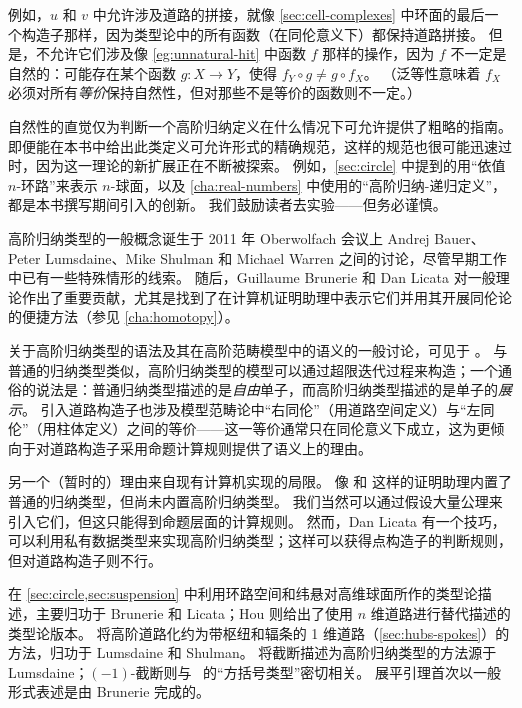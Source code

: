 例如，$u$ 和 $v$ 中允许涉及道路的拼接，就像 \cref{sec:cell-complexes} 中环面的最后一个构造子那样，因为类型论中的所有函数（在同伦意义下）都保持道路拼接。
但是，不允许它们涉及像 \cref{eg:unnatural-hit} 中函数 $f$ 那样的操作，因为 $f$ 不一定是自然的：可能存在某个函数 $g:X\to Y$，使得 $f_Y \circ g \neq g\circ f_X$。
（泛等性意味着 $f_X$ 必须对所有\emph{等价}保持自然性，但对那些不是等价的函数则不一定。）

自然性的直觉仅为判断一个高阶归纳定义在什么情况下可允许提供了粗略的指南。
即便能在本书中给出此类定义可允许形式的精确规范，这样的规范也很可能迅速过时，因为这一理论的新扩展正在不断被探索。
例如，\cref{sec:circle} 中提到的用``依值 $n$-环路''来表示 $n$-球面，以及 \cref{cha:real-numbers} 中使用的``高阶归纳-递归定义''，都是本书撰写期间引入的创新。
我们鼓励读者去实验——但务必谨慎。

\sectionNotes

高阶归纳类型的一般概念诞生于 2011 年 Oberwolfach 会议上 Andrej Bauer、Peter Lumsdaine、Mike Shulman 和 Michael Warren 之间的讨论，尽管早期工作中已有一些特殊情形的线索。
随后，Guillaume Brunerie 和 Dan Licata 对一般理论作出了重要贡献，尤其是找到了在计算机证明助理中表示它们并用其开展同伦论的便捷方法（参见 \cref{cha:homotopy}）。

关于高阶归纳类型的语法及其在高阶范畴模型中的语义的一般讨论，可见于 \cite{ls:hits}。
与普通的归纳类型类似，高阶归纳类型的模型可以通过超限迭代过程来构造；一个通俗的说法是：普通归纳类型描述的是\emph{自由}单子，而高阶归纳类型描述的是单子的\emph{展示}。
引入道路构造子也涉及模型范畴论中``右同伦''（用道路空间定义）与``左同伦''（用柱体定义）之间的等价——这一等价通常只在同伦意义下成立，这为更倾向于对道路构造子采用命题计算规则提供了语义上的理由。

另一个（暂时的）理由来自现有计算机实现的局限。
像 \Coq 和 \Agda 这样的证明助理内置了普通的归纳类型，但尚未内置高阶归纳类型。
我们当然可以通过假设大量公理来引入它们，但这只能得到命题层面的计算规则。
然而，Dan Licata 有一个技巧，可以利用私有数据类型来实现高阶归纳类型；这样可以获得点构造子的判断规则，但对道路构造子则不行。

在 \cref{sec:circle,sec:suspension} 中利用环路空间和纬悬对高维球面所作的类型论描述，主要归功于 Brunerie 和 Licata；Hou 则给出了使用 $n$ 维道路进行替代描述的类型论版本。
将高阶道路化约为带枢纽和辐条的 1 维道路（\cref{sec:hubs-spokes}）的方法，归功于 Lumsdaine 和 Shulman。
将截断描述为高阶归纳类型的方法源于 Lumsdaine；$(-1)$-截断则与~\cite{ab:bracket-types} 的“方括号类型”密切相关。
展平引理首次以一般形式表述是由 Brunerie 完成的。

